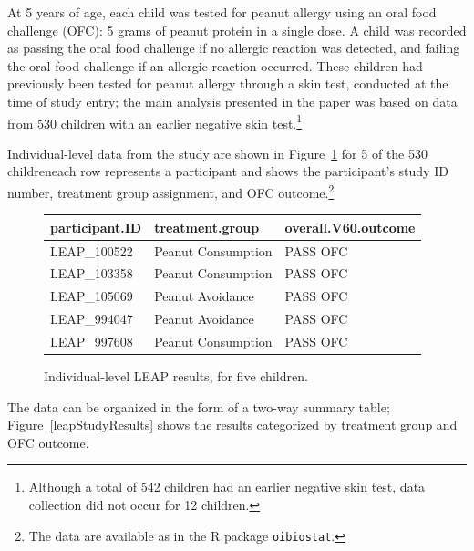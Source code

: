 At 5 years of age, each child was tested for peanut allergy using an oral food challenge (OFC): 5 grams of peanut protein in a single dose. A child was recorded as passing the oral food challenge if no allergic reaction was detected, and failing the oral food challenge if an allergic reaction occurred. These children had previously been tested for peanut allergy through a skin test, conducted at the time of study entry; the main analysis presented in the paper was based on data from 530 children with an earlier negative skin test.\footnote{Although a total of 542 children had an earlier negative skin test, data collection did not occur for 12 children.} 

Individual-level data from the study are shown in Figure~\ref{leapStudyResultsDF} for 5 of the 530 children\textemdash each row represents a participant and shows the participant's study ID number, treatment group assignment, and OFC outcome.\footnote{The data are available as  in the \textsf{R} package \texttt{oibiostat}.}
 

\begin{figure}[ht]
\centering
\begin{tabular}{lll}
  \hline
participant.ID & treatment.group & overall.V60.outcome \\ 
  \hline
LEAP\_100522 & Peanut Consumption & PASS OFC \\ 
  LEAP\_103358 & Peanut Consumption & PASS OFC \\ 
  LEAP\_105069 & Peanut Avoidance & PASS OFC \\ 
  LEAP\_994047 & Peanut Avoidance & PASS OFC \\ 
  LEAP\_997608 & Peanut Consumption & PASS OFC \\ 
   \hline
\end{tabular}
\caption{Individual-level LEAP results, for five children.}
\label{leapStudyResultsDF}
\end{figure}


The data can be organized in the form of a two-way summary table; Figure~\ref{leapStudyResults} shows the results categorized by treatment group and OFC outcome. 

